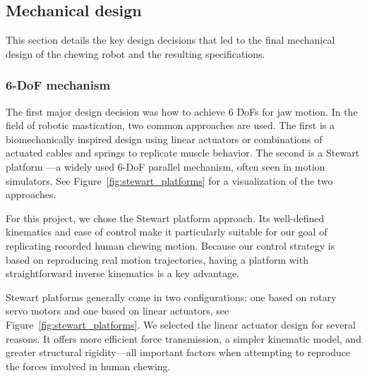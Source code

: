 \subsection{Mechanical design}
\label{sec:mechanical_design}

This section details the key design decisions that led to the final mechanical design of the chewing robot and the resulting specifications.

\subsubsection{6-DoF mechanism}

The first major design decision was how to achieve 6 DoFs for jaw motion. In the field of robotic mastication, two common approaches 
are used. The first is a biomechanically inspired design using linear actuators \cite{ChewingRobotLinearActuator} or combinations of actuated cables and 
springs \cite{ChewingRobotGums} to replicate muscle behavior. The second is a Stewart platform \cite{BristolChewingRobot}—a widely used 6-DoF parallel mechanism, often seen in 
motion simulators. See Figure~\ref{fig:stewart_platforms} for a visualization of the two approaches.

For this project, we chose the Stewart platform approach. Its well-defined kinematics and ease of control make it particularly suitable for our goal of 
replicating recorded human chewing motion. Because our control strategy is based on reproducing real motion trajectories, having a platform with 
straightforward inverse kinematics is a key advantage.

Stewart platforms generally come in two configurations: one based on rotary servo motors and one based on linear actuators, see Figure~\ref{fig:stewart_platforms}. 
We selected the linear actuator design for several reasons. It offers more efficient force transmission, a simpler kinematic model, and greater structural 
rigidity—all important factors when attempting to reproduce the forces involved in human chewing.

